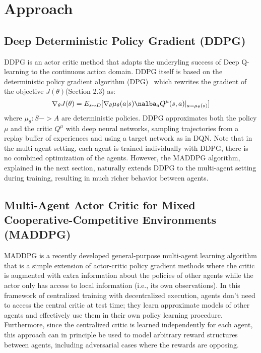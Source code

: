 
\section{Approach}
\label{sec:approach}

\subsection{Deep Deterministic Policy Gradient (DDPG)}
DDPG is an actor critic method that adapts the underyling success of Deep Q-learning 
to the continuous action domain. DDPG itself is based on the deterministic
policy gradient algorithm (DPG)~\cite{silver2014deterministic} which rewrites the gradient
of the objective $J(\theta)$(Section 2.3) as:
\begin{equation}
\nabla_{\theta}J(\theta) = E_{s \sim D} [\nabla_{\theta}\mu_{\theta}(a|s)\nalba_{a} Q^{\mu}(s,a)|_{a = \mu_{\theta}(s)}]
\end{equation}
where $\mu_{\theta}: S -> A$ are deterministic policies. DDPG approximates
both the policy $\mu$ and the critic $Q^{\mu}$ with deep neural networks, sampling
trajectories from a replay buffer of experiences and using a target network as 
in DQN. Note that in the multi agent setting, each agent is trained individually
with DDPG, there is no combined optimization of the agents. However, the MADDPG 
algorithm, explained in the next section, naturally extends DDPG to the multi-agent
setting during training, resulting in much richer behavior between agents. 

\subsection{Multi-Agent Actor Critic for Mixed Cooperative-Competitive Environments (MADDPG)}
MADDPG is a recently developed general-purpose multi-agent learning algorithm
that is a simple extension of actor-critic policy gradient methods where the
critic is augmented with extra information about the policies of other agents
while the actor only has access to local information (i.e., its own
observations). In this framework of centralized training with decentralized
execution, agents don’t need to access the central critic at test time; they
learn approximate models of other agents and effectively use them in their own
policy learning procedure. Furthermore, since the centralized critic is
learned independently for each agent, this approach can in principle be used
to model arbitrary reward structures between agents, including adversarial
cases where the rewards are opposing.

